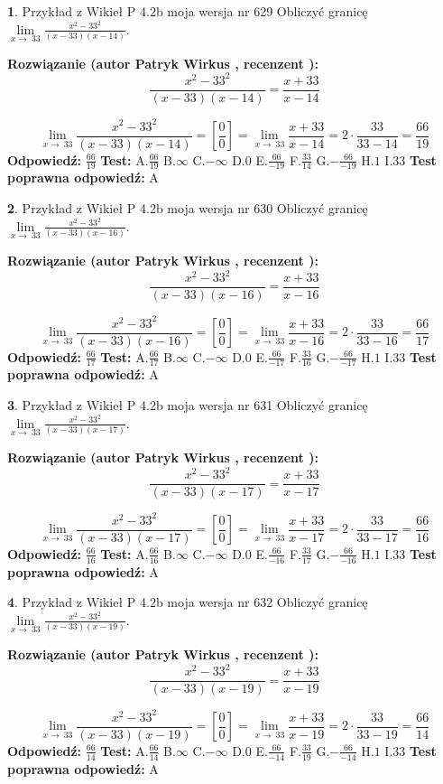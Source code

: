\documentclass[12pt, a4paper]{article}
\theoremstyle{definition} %
\newtheorem{zad}{}
\newcommand{\zadStart}[1]{\begin{zad}#1\newline}
\newcommand{\zadStop}{\end{zad}}
\newcommand{\rozwStart}[2]{\noindent \textbf{Rozwiązanie (autor #1 , recenzent #2): }\newline}
\newcommand{\rozwStop}{\newline}
\newcommand{\odpStart}{\noindent \textbf{Odpowiedź:}\newline}
\newcommand{\odpStop}{\newline}
\newcommand{\testStart}{\noindent \textbf{Test:}\newline}
\newcommand{\testStop}{\newline}
\newcommand{\kluczStart}{\noindent \textbf{Test poprawna odpowiedź:}\newline}
\newcommand{\kluczStop}{\newline}
\begin{document}
\zadStart{Przykład z Wikieł P 4.2b moja wersja nr 629}
Obliczyć granicę $\lim\limits_{x\to\ 33}\frac{x^{2}-33^{2}}{(x-33)(x-14)}$.
\zadStop
\rozwStart{Patryk Wirkus}{}
$$\frac{x^{2}-33^{2}}{(x-33)(x-14)}=\frac{x+33}{x-14}$$

$$\lim\limits_{x\to\ 33}\frac{x^{2}-33^{2}}{(x-33)(x-14)}=[\frac{0}{0}]=\lim\limits_{x\to\ 33}\frac{x+33}{x-14}=2 \cdot \frac{33}{33-14} = \frac{66}{19}$$
\rozwStop
\odpStart
$\frac{66}{19}$
\odpStop
\testStart
A.$\frac{66}{19}$
B.$\infty$
C.$-\infty$
D.$0$
E.$\frac{66}{-19}$
F.$\frac{33}{14}$
G.$-\frac{66}{-19}$
H.$1$
I.$33$
\testStop
\kluczStart
A
\kluczStop



\zadStart{Przykład z Wikieł P 4.2b moja wersja nr 630}
Obliczyć granicę $\lim\limits_{x\to\ 33}\frac{x^{2}-33^{2}}{(x-33)(x-16)}$.
\zadStop
\rozwStart{Patryk Wirkus}{}
$$\frac{x^{2}-33^{2}}{(x-33)(x-16)}=\frac{x+33}{x-16}$$

$$\lim\limits_{x\to\ 33}\frac{x^{2}-33^{2}}{(x-33)(x-16)}=[\frac{0}{0}]=\lim\limits_{x\to\ 33}\frac{x+33}{x-16}=2 \cdot \frac{33}{33-16} = \frac{66}{17}$$
\rozwStop
\odpStart
$\frac{66}{17}$
\odpStop
\testStart
A.$\frac{66}{17}$
B.$\infty$
C.$-\infty$
D.$0$
E.$\frac{66}{-17}$
F.$\frac{33}{16}$
G.$-\frac{66}{-17}$
H.$1$
I.$33$
\testStop
\kluczStart
A
\kluczStop



\zadStart{Przykład z Wikieł P 4.2b moja wersja nr 631}
Obliczyć granicę $\lim\limits_{x\to\ 33}\frac{x^{2}-33^{2}}{(x-33)(x-17)}$.
\zadStop
\rozwStart{Patryk Wirkus}{}
$$\frac{x^{2}-33^{2}}{(x-33)(x-17)}=\frac{x+33}{x-17}$$

$$\lim\limits_{x\to\ 33}\frac{x^{2}-33^{2}}{(x-33)(x-17)}=[\frac{0}{0}]=\lim\limits_{x\to\ 33}\frac{x+33}{x-17}=2 \cdot \frac{33}{33-17} = \frac{66}{16}$$
\rozwStop
\odpStart
$\frac{66}{16}$
\odpStop
\testStart
A.$\frac{66}{16}$
B.$\infty$
C.$-\infty$
D.$0$
E.$\frac{66}{-16}$
F.$\frac{33}{17}$
G.$-\frac{66}{-16}$
H.$1$
I.$33$
\testStop
\kluczStart
A
\kluczStop



\zadStart{Przykład z Wikieł P 4.2b moja wersja nr 632}
Obliczyć granicę $\lim\limits_{x\to\ 33}\frac{x^{2}-33^{2}}{(x-33)(x-19)}$.
\zadStop
\rozwStart{Patryk Wirkus}{}
$$\frac{x^{2}-33^{2}}{(x-33)(x-19)}=\frac{x+33}{x-19}$$

$$\lim\limits_{x\to\ 33}\frac{x^{2}-33^{2}}{(x-33)(x-19)}=[\frac{0}{0}]=\lim\limits_{x\to\ 33}\frac{x+33}{x-19}=2 \cdot \frac{33}{33-19} = \frac{66}{14}$$
\rozwStop
\odpStart
$\frac{66}{14}$
\odpStop
\testStart
A.$\frac{66}{14}$
B.$\infty$
C.$-\infty$
D.$0$
E.$\frac{66}{-14}$
F.$\frac{33}{19}$
G.$-\frac{66}{-14}$
H.$1$
I.$33$
\testStop
\kluczStart
A
\kluczStop
\end{document}
